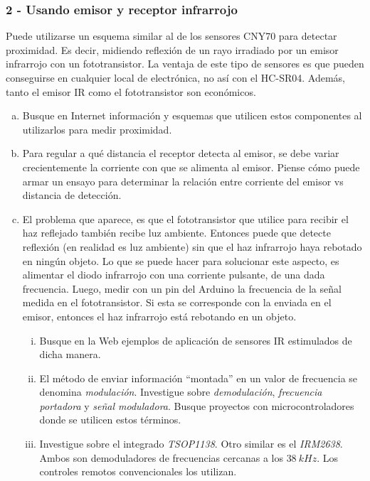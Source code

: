 \documentclass[a4paper,10pt]{article}
\begin{document}
\subsubsection*{2 - Usando emisor y receptor infrarrojo}

Puede utilizarse un esquema similar al de los sensores CNY70 para detectar proximidad. Es decir, midiendo reflexión de un rayo irradiado por un emisor infrarrojo con un fototransistor. 
La ventaja de este tipo de sensores es que pueden conseguirse en cualquier local de electrónica, no así con el HC-SR04. Además, tanto el emisor IR como el fototransistor son económicos.

\begin{enumerate}[(a)]
	\item Busque en Internet información y esquemas que utilicen estos componentes al utilizarlos para medir proximidad.
	\item Para regular a qué distancia el receptor detecta al emisor, se debe variar crecientemente la corriente con que se alimenta al emisor. Piense cómo puede armar un ensayo 
	para determinar la relación entre corriente del emisor vs distancia de detección.
	\item El problema que aparece, es que el fototransistor que utilice para recibir el haz reflejado también recibe luz ambiente. Entonces puede que detecte reflexión (en realidad es luz ambiente) sin que el haz 
	infrarrojo haya rebotado en ningún objeto. Lo que se puede hacer para solucionar este aspecto, es alimentar el diodo infrarrojo con una corriente pulsante, de una dada frecuencia. Luego, medir con un pin del Arduino 
	la frecuencia de la señal medida en el fototransistor. Si esta se corresponde con la enviada en el emisor, entonces el haz infrarrojo está rebotando en un objeto. 
	\begin{enumerate}[(i)]
	  \item Busque en la Web ejemplos de aplicación de sensores IR estimulados de dicha manera.
	  \item El método de enviar información ``montada'' en un valor de frecuencia se denomina \textit{modulación}. Investigue sobre \textit{demodulación}, \textit{frecuencia portadora} y \textit{señal moduladora}. 
	  Busque proyectos con microcontroladores donde se utilicen estos términos.
	  \item Investigue sobre el integrado \textit{TSOP1138}. Otro similar es el \textit{IRM2638}. Ambos son demoduladores de frecuencias cercanas a los $38\ kHz$. Los controles remotos convencionales los utilizan. 
	\end{enumerate}

\end{enumerate}
\end{document}
